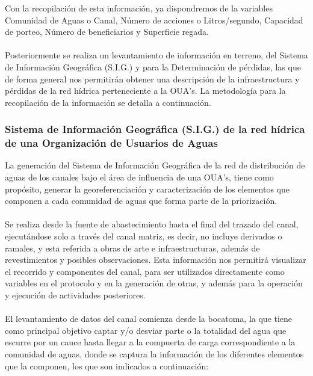 \documentclass[]{article}
\begin{document}
Con la recopilación de esta información, ya dispondremos de la variables Comunidad de Aguas o Canal, Número de acciones o Litros/segundo, Capacidad de porteo, Número de beneficiarios y Superficie regada.\\
\\
Posteriormente se realiza un levantamiento de información en terreno, del Sistema de Información Geográfica (S.I.G.) y para la Determinación de pérdidas, las que de forma general nos permitirán obtener una descripción de la infraestructura y pérdidas de la red hídrica perteneciente a la OUA's. La metodología para la recopilación de la información se detalla a continuación.

\subsubsection{Sistema de Información Geográfica (S.I.G.) de la red hídrica de una Organización de Usuarios de Aguas}

La generación del Sistema de Información Geográfica de la red de distribución de aguas de los canales bajo el área de influencia de una OUA's, tiene como propósito, generar la georeferenciación y caracterización de los elementos que componen a cada comunidad de aguas que forma parte de la priorización.\\
\\
Se realiza desde la fuente de abastecimiento hasta el final del trazado del canal, ejecutándose solo a través del canal matriz, es decir, no incluye derivados o ramales, y esta referida a obras de arte e infraestructuras, además de revestimientos y posibles observaciones. Esta información nos permitirá visualizar el recorrido y componentes del canal, para ser utilizados directamente como variables en el protocolo y en la generación de otras, y además para la operación y ejecución de actividades posteriores.\\
\\
El levantamiento de datos del canal comienza desde la bocatoma, la que tiene como principal objetivo captar y/o desviar parte o la totalidad del agua que escurre por un cauce hasta llegar a la compuerta de carga correspondiente a la comunidad de aguas, donde se captura la información de los diferentes elementos que la componen, los que son indicados a continuación:
\end{document}
